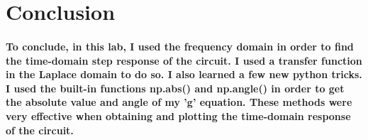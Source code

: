 \documentclass[12pt,a4paper]{article}
\begin{document}
\section{Conclusion}\label{sec:res}

\paragraph{To conclude, in this lab, I used the frequency domain in order to find the time-domain step response of the circuit. I used a transfer function in the Laplace domain to do so. I also learned a few new python tricks. I used the built-in functions np.abs() and np.angle() in order to get the absolute value and angle of my 'g' equation. These methods were very effective when obtaining and plotting the time-domain response of the circuit.}






\end{document}
